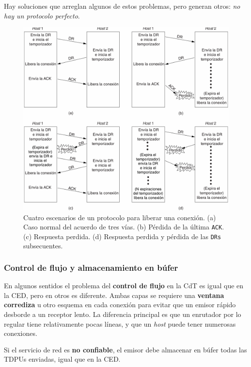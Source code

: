 \documentclass[10pt,a4paper]{article}
\begin{document}
Hay soluciones que arreglan algunos de estos problemas, pero generan otros: \textit{no hay un protocolo perfecto}.
\newline
\begin{figure}[ht!]
  \caption{Cuatro escenarios de un protocolo para liberar una conexión. (a) Caso normal del acuerdo de tres vías. (b) Pérdida de la última \texttt{ACK}. (c) Respuesta perdida. (d) Respuesta perdida y pérdida de las \texttt{DRs} subsecuentes.}
  \label{fig:liberacion_simetrica}
  \centerline{\includegraphics[width=\textwidth-\fboxrule-\fboxrule]{imgs/liberacion_simetrica.png}}
\end{figure}

\subsubsection{Control de flujo y almacenamiento en búfer}

En algunos sentidos el problema del \textbf{control de flujo} en la CdT es igual que en la CED, pero en otros es diferente. Ambas capas se requiere una \textbf{ventana corrediza} u otro esquema en cada conexión para evitar que un emisor rápido desborde a un receptor lento. La diferencia principal es que un enrutador por lo regular tiene relativamente pocas líneas, y que un \textit{host} puede tener numerosas conexiones. 

Si el servicio de red es \textbf{no confiable}, el emisor debe almacenar en búfer todas las TDPUs enviadas, igual que en la CED.
\end{document}
